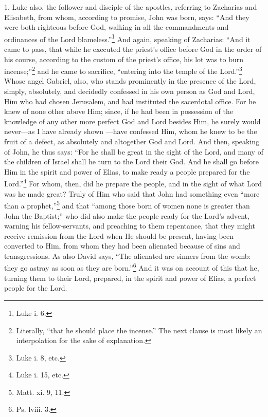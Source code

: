 
1. Luke also, the follower and disciple of the apostles, referring to Zacharias and Elisabeth, from whom, according to promise, John was born, says: “And they were both righteous before God, walking in all the commandments and ordinances of the Lord blameless.”\footnote{Luke i. 6.} And again, speaking of Zacharias: “And it came to pass, that while he executed the priest’s office before God in the order of his course, according to the custom of the priest’s office, his lot was to burn incense;”\footnote{Literally, “that he should place the incense.” The next clause is most likely an interpolation for the sake of explanation.} and he came to sacrifice, “entering into the temple of the Lord.”\footnote{Luke i. 8, etc.} Whose angel Gabriel, also, who stands prominently in the presence of the Lord, simply, absolutely, and decidedly confessed in his own person as God and Lord, Him who had chosen Jerusalem, and had instituted the sacerdotal office. For he knew of none other above Him; since, if he had been in possession of the knowledge of any other more perfect God and Lord besides Him, he surely would never—as I have already shown —have confessed Him, whom he knew to be the fruit of a defect, as absolutely and altogether God and Lord. And then, speaking of John, he thus says: “For he shall be great in the sight of the Lord, and many of the children of Israel shall he turn to the Lord their God. And he shall go before Him in the spirit and power of Elias, to make ready a people prepared for the Lord.”\footnote{Luke i. 15, etc.} For whom, then, did he prepare the people, and in the sight of what Lord was he made great? Truly of Him who said that John had something even “more than a prophet,”\footnote{Matt. xi. 9, 11.} and that “among those born of women none is greater than John the Baptist;” who did also make the people ready for the Lord’s advent, warning his fellow-servants, and preaching to them repentance, that  they might receive remission from the Lord when He should be present, having been converted to Him, from whom they had been alienated because of sins and transgressions. As also David says, “The alienated are sinners from the womb: they go astray as soon as they are born.”\footnote{Ps. lviii. 3.} And it was on account of this that he, turning them to their Lord, prepared, in the spirit and power of Elias, a perfect people for the Lord.


